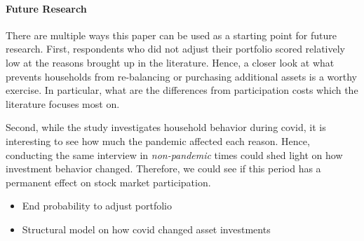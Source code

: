 \documentclass[ProjectABM]{subfiles}
\begin{document}

\paragraph{Future Research}
There are multiple ways this paper can be used as a starting point for future research. First, respondents who did not adjust their portfolio scored relatively low at the reasons brought up in the literature. Hence, a closer look at what prevents households from re-balancing or purchasing additional assets is a worthy exercise. In particular, what are the differences from participation costs which the literature focuses most on.

Second, while the study investigates household behavior during covid, it is interesting to see how much the pandemic affected each reason. Hence, conducting the same interview in \textit{non-pandemic} times could shed light on how investment behavior changed. Therefore, we could see if this period has a permanent effect on stock market participation.

\begin{itemize}
	\item End probability to adjust portfolio
	\item Structural model on how covid changed asset investments
\end{itemize}


\onlyinsubfile{}
%
\end{document}
